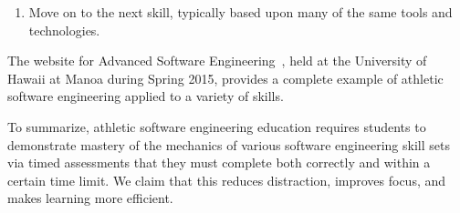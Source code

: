 \begin{enumerate}
\item Move on to the next skill, typically based upon many of the same tools and technologies. %

\end{enumerate} 

The website for Advanced Software Engineering~\cite{ics613s15}, held at the University of Hawaii at Manoa during Spring 2015, provides a complete example of athletic software engineering applied to a variety of skills.

To summarize, athletic software engineering education requires students to demonstrate mastery of the mechanics of various software engineering skill sets via timed assessments that they must complete both correctly and within a certain time limit.  We claim that this reduces distraction, improves focus, and makes learning more efficient.  

















